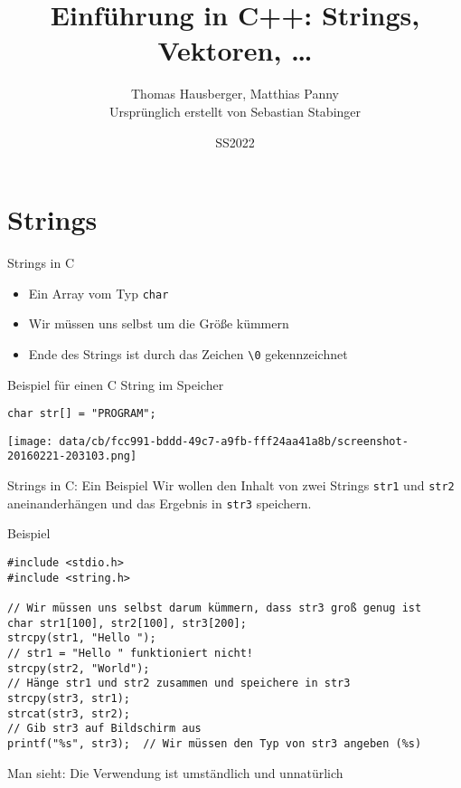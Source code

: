 \documentclass[presentation]{beamer}
\author{Thomas Hausberger, Matthias Panny \\ Ursprünglich erstellt von Sebastian Stabinger}
\date{SS2022}
\title{Einführung in C++: Strings, Vektoren, \ldots{}}
\begin{document}
\maketitle

\section{Strings}
\label{sec:org3443d4e}
\begin{frame}[label={sec:orgf67ddad},fragile]{Strings in C}
 \begin{itemize}
\item Ein Array vom Typ {\color{solarizedYellow}\verb!char!}
\item Wir müssen uns selbst um die Größe kümmern
\item Ende des Strings ist durch das Zeichen {\color{solarizedYellow}\verb!\0!} gekennzeichnet
\end{itemize}
\begin{block}{Beispiel für einen C String im Speicher}
\begin{verbatim}
char str[] = "PROGRAM";
\end{verbatim}
\begin{center}
\texttt{[image: data/cb/fcc991-bddd-49c7-a9fb-fff24aa41a8b/screenshot-20160221-203103.png]}
\end{center}
\end{block}
\end{frame}
\begin{frame}[label={sec:org4d7e36d},fragile]{Strings in C: Ein Beispiel}
 Wir wollen den Inhalt von zwei Strings {\color{solarizedYellow}\verb!str1!} und {\color{solarizedYellow}\verb!str2!}
aneinanderhängen und das Ergebnis in {\color{solarizedYellow}\verb!str3!} speichern.
\begin{exampleblock}{Beispiel}
\begin{verbatim}
#include <stdio.h>
#include <string.h>

// Wir müssen uns selbst darum kümmern, dass str3 groß genug ist
char str1[100], str2[100], str3[200];
strcpy(str1, "Hello ");
// str1 = "Hello " funktioniert nicht!
strcpy(str2, "World");
// Hänge str1 und str2 zusammen und speichere in str3
strcpy(str3, str1);
strcat(str3, str2);
// Gib str3 auf Bildschirm aus
printf("%s", str3);  // Wir müssen den Typ von str3 angeben (%s)
\end{verbatim}
\end{exampleblock}
Man sieht: Die Verwendung ist \alert{umständlich und unnatürlich}
\end{frame}
\end{document}
